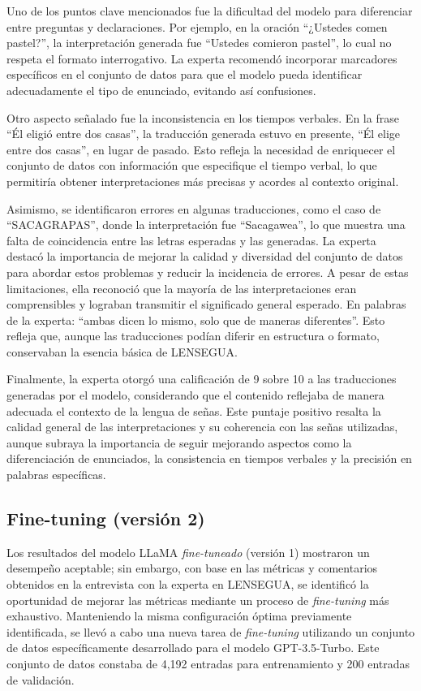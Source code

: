 Uno de los puntos clave mencionados fue la dificultad del modelo para diferenciar entre preguntas y declaraciones. Por ejemplo, en la oración “¿Ustedes comen pastel?”, la interpretación generada fue “Ustedes comieron pastel”, lo cual no respeta el formato interrogativo. La experta recomendó incorporar marcadores específicos en el conjunto de datos para que el modelo pueda identificar adecuadamente el tipo de enunciado, evitando así confusiones. 

Otro aspecto señalado fue la inconsistencia en los tiempos verbales. En la frase “Él eligió entre dos casas”, la traducción generada estuvo en presente, “Él elige entre dos casas”, en lugar de pasado. Esto refleja la necesidad de enriquecer el conjunto de datos con información que especifique el tiempo verbal, lo que permitiría obtener interpretaciones más precisas y acordes al contexto original. 

Asimismo, se identificaron errores en algunas traducciones, como el caso de “SACAGRAPAS”, donde la interpretación fue “Sacagawea”, lo que muestra una falta de coincidencia entre las letras esperadas y las generadas. La experta destacó la importancia de mejorar la calidad y diversidad del conjunto de datos para abordar estos problemas y reducir la incidencia de errores. A pesar de estas limitaciones, ella reconoció que la mayoría de las interpretaciones eran comprensibles y lograban transmitir el significado general esperado. En palabras de la experta: “ambas dicen lo mismo, solo que de maneras diferentes”. Esto refleja que, aunque las traducciones podían diferir en estructura o formato, conservaban la esencia básica de LENSEGUA.

Finalmente, la experta otorgó una calificación de 9 sobre 10 a las traducciones generadas por el modelo, considerando que el contenido reflejaba de manera adecuada el contexto de la lengua de señas. Este puntaje positivo resalta la calidad general de las interpretaciones y su coherencia con las señas utilizadas, aunque subraya la importancia de seguir mejorando aspectos como la diferenciación de enunciados, la consistencia en tiempos verbales y la precisión en palabras específicas.


\subsection{Fine-tuning (versión 2)}

Los resultados del modelo LLaMA \textit{fine-tuneado} (versión 1) mostraron un desempeño aceptable; sin embargo, con base en las métricas y comentarios obtenidos en la entrevista con la experta en LENSEGUA, se identificó la oportunidad de mejorar las métricas mediante un proceso de \textit{fine-tuning} más exhaustivo. Manteniendo la misma configuración óptima previamente identificada, se llevó a cabo una nueva tarea de \textit{fine-tuning} utilizando un conjunto de datos específicamente desarrollado para el modelo GPT-3.5-Turbo. Este conjunto de datos constaba de 4,192 entradas para entrenamiento y 200 entradas de validación.

